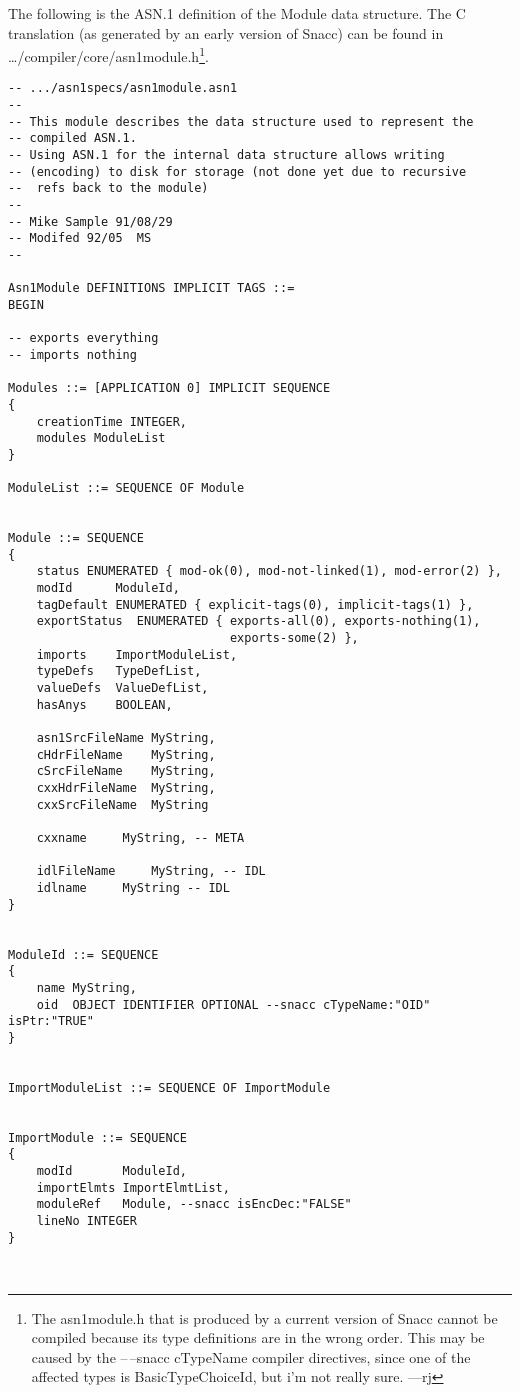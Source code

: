 The following is the ASN.1 definition of the Module data structure.
The C translation (as generated by an early version of Snacc) can be
found in {\ufn \dots/compiler/core/asn1module.h}\footnote{
  The {\ufn asn1module.h} that is produced by a current version of Snacc cannot be compiled because its type definitions are in the wrong order.
  This may be caused by the {\ASN --\,--snacc cTypeName} compiler directives, since one of the affected types is BasicTypeChoiceId, but i'm not really sure.
  ---rj
}.
\begin{small}
\begin{verbatim}
-- .../asn1specs/asn1module.asn1
--
-- This module describes the data structure used to represent the
-- compiled ASN.1.
-- Using ASN.1 for the internal data structure allows writing
-- (encoding) to disk for storage (not done yet due to recursive
--  refs back to the module)
--
-- Mike Sample 91/08/29
-- Modifed 92/05  MS
--

Asn1Module DEFINITIONS IMPLICIT TAGS ::=
BEGIN

-- exports everything
-- imports nothing

Modules ::= [APPLICATION 0] IMPLICIT SEQUENCE
{
    creationTime INTEGER,
    modules ModuleList
}

ModuleList ::= SEQUENCE OF Module


Module ::= SEQUENCE
{
    status ENUMERATED { mod-ok(0), mod-not-linked(1), mod-error(2) },
    modId      ModuleId,
    tagDefault ENUMERATED { explicit-tags(0), implicit-tags(1) },
    exportStatus  ENUMERATED { exports-all(0), exports-nothing(1),
                               exports-some(2) },
    imports    ImportModuleList,
    typeDefs   TypeDefList,
    valueDefs  ValueDefList,
    hasAnys    BOOLEAN,

    asn1SrcFileName MyString,
    cHdrFileName    MyString,
    cSrcFileName    MyString,
    cxxHdrFileName  MyString,
    cxxSrcFileName  MyString

    cxxname		MyString, -- META

    idlFileName		MyString, -- IDL
    idlname		MyString -- IDL
}


ModuleId ::= SEQUENCE
{
    name MyString,
    oid  OBJECT IDENTIFIER OPTIONAL --snacc cTypeName:"OID" isPtr:"TRUE"
}


ImportModuleList ::= SEQUENCE OF ImportModule


ImportModule ::= SEQUENCE
{
    modId       ModuleId,
    importElmts ImportElmtList,
    moduleRef   Module, --snacc isEncDec:"FALSE"
    lineNo INTEGER
}



\end{verbatim}
\end{small}
